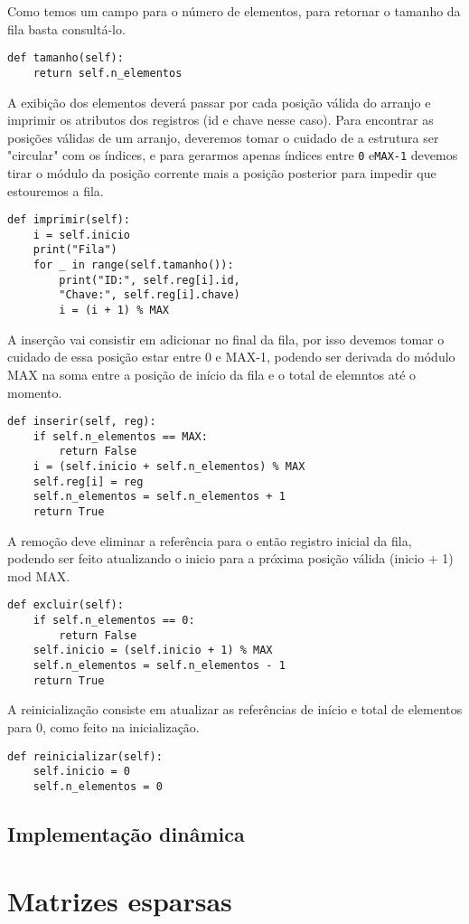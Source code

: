 \documentclass[a4paper, twocolumn]{article}
\theoremstyle{definition}
\begin{document}
Como temos um campo para o número de elementos, para retornar o tamanho da fila basta consultá-lo.
\begin{lstlisting}[label=fila_estat_tamanho, caption= Fila estática (tamanho)]
def tamanho(self):
    return self.n_elementos
\end{lstlisting}

A exibição dos elementos deverá passar por cada posição válida do arranjo e imprimir os atributos dos registros (id e chave nesse caso). Para encontrar as posições válidas de um arranjo, deveremos tomar o cuidado de a estrutura ser "circular" com os índices, e para gerarmos apenas índices entre \texttt{0} e\texttt{MAX-1} devemos tirar o módulo da posição corrente mais a posição posterior para impedir que estouremos a fila.
\begin{lstlisting}[label=fila_estat_imprimir, caption= Fila estática (exibição)]
def imprimir(self):
    i = self.inicio
    print("Fila")
    for _ in range(self.tamanho()):
        print("ID:", self.reg[i].id,
        "Chave:", self.reg[i].chave)
        i = (i + 1) % MAX
    \end{lstlisting}

A inserção vai consistir em adicionar no final da fila, por isso devemos tomar o cuidado de essa posição estar entre 0 e MAX-1, podendo ser derivada do módulo MAX na soma entre a posição de início da fila e o total de elemntos até o momento.
\begin{lstlisting}[label=fila_estat_inserir, caption= Fila estática (inserção)]
def inserir(self, reg):
    if self.n_elementos == MAX:
        return False
    i = (self.inicio + self.n_elementos) % MAX
    self.reg[i] = reg
    self.n_elementos = self.n_elementos + 1
    return True
\end{lstlisting}

A remoção deve eliminar a referência para o então registro inicial da fila, podendo ser feito atualizando o inicio para a próxima posição válida (inicio + 1) mod MAX.
\begin{lstlisting}[label=fila_estat_excluir, caption= Fila estática (remoção)]
def excluir(self):
    if self.n_elementos == 0: 
        return False
    self.inicio = (self.inicio + 1) % MAX
    self.n_elementos = self.n_elementos - 1
    return True
\end{lstlisting}

A reinicialização consiste em atualizar as referências de início e total de elementos para 0, como feito na inicialização.
\begin{lstlisting}[label=fila_estat_reiniciar, caption= Fila estática (reinicialização)]
def reinicializar(self):
    self.inicio = 0
    self.n_elementos = 0
\end{lstlisting}

\subsection{Implementação dinâmica}

\section{Matrizes esparsas}
\end{document}
